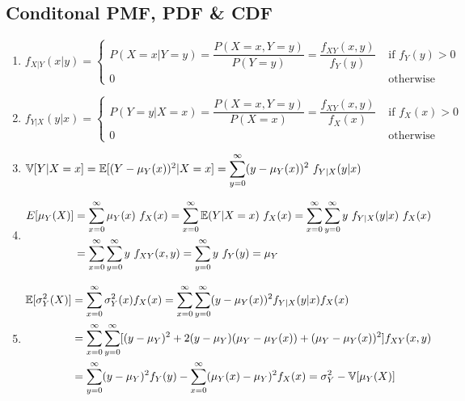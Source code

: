 \subsection{Conditonal PMF, PDF \& CDF}

\begin{enumerate}[resume*=calcrulesrv]
    \item
    $
        f _{X|Y} (x|y)
        = \begin{cases}
            P(X = x|Y = y)
            = \dfrac{P(X = x, Y = y)} {P(Y = y) }
            = \dfrac{f _{X Y} (x, y)} {f_Y (y) } & \text{ if } f _Y (y) > 0 \\
            0 & \text{ otherwise}
        \end{cases}
    $
    \hfill \cite{statistics/book/Statistics-for-Data-Scientists/Maurits-Kaptein}

    \item
    $
        f _{Y|X} (y|x)
        = \begin{cases}
            P(Y = y|X = x)
            = \dfrac{P(X = x, Y = y)} {P(X = x) }
            = \dfrac{f _{X Y} (x, y)} {f_X (x) } & \text{ if } f _X (x) > 0 \\
            0 & \text{ otherwise}
        \end{cases}
    $
    \hfill \cite{statistics/book/Statistics-for-Data-Scientists/Maurits-Kaptein}

    \item
    $
        \mathbb{V}[Y |X = x]
        = \mathbb{E}[(Y - \mu_Y (x))^2|X = x]
        = \displaystyle\sum^\infty_{y=0} (y - \mu_Y (x))^2\ f_{Y |X} (y|x)
    $
    \hfill \cite{statistics/book/Statistics-for-Data-Scientists/Maurits-Kaptein}

    \item 
    $
        \begin{aligned}
            E[\mu_Y (X)] 
            &= \dsum^\infty_{x=0} \mu_Y (x)\ f_X (x)
            = \dsum^\infty_{x=0} \mbbE(Y |X = x)\ f_X (x)
            = \dsum^\infty_{x=0} \dsum^\infty_{y=0} y\ f_{Y |X} (y|x)\ f_X (x) \\
            &= \dsum^\infty_{x=0} \dsum^\infty_{y=0} y\ f_{X Y} (x, y)
            = \dsum^\infty_{y=0} y\ f_Y (y) 
            = \mu_Y
        \end{aligned}
    $
    \hfill \cite{statistics/book/Statistics-for-Data-Scientists/Maurits-Kaptein}

    \item 
    $
        \begin{aligned}
            \mathbb{E}[\sigma^2_Y (X)]
            &= \displaystyle\sum^\infty_{x=0} \sigma^2_Y (x) f_X (x)
            = \displaystyle\sum^\infty_{x=0} \displaystyle\sum^\infty_{y=0} (y - \mu_Y (x))^2 f_{Y |X} (y|x) f_X (x) \\
            &= \displaystyle\sum^\infty_{x=0} \displaystyle\sum^\infty_{y=0} [(y - \mu_Y )^2 + 2(y - \mu_Y )(\mu_Y - \mu_Y (x)) + (\mu_Y - \mu_Y (x))^2] f_{X Y} (x, y) \\
            &= \displaystyle\sum^\infty_{y=0} (y - \mu_Y )^2 f_Y (y) - \displaystyle\sum^\infty_{x=0} (\mu_Y (x) - \mu_Y )^2 f_X (x)
            = \sigma^2_Y - \mathbb{V}[\mu_Y (X)]
        \end{aligned}
    $
    \hfill \cite{statistics/book/Statistics-for-Data-Scientists/Maurits-Kaptein}
\end{enumerate}
